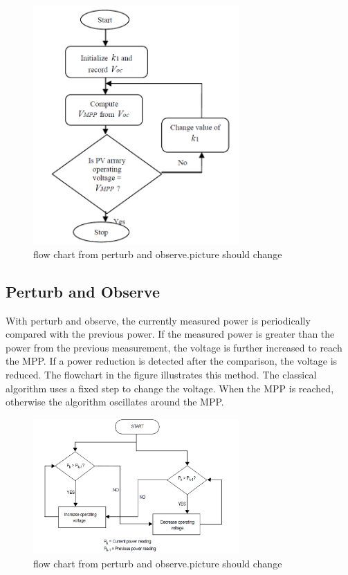 \begin{figure}[htbp]
	\begin{center}
		\includegraphics[width=0.7\textwidth]{../Pictures/P1/Flow_chart/Flow_chart_constant_voltage}
		\caption{flow chart from perturb and observe.picture should change }
		\label{fcconstantvoltage}
	\end{center}	
\end{figure}

\subsection{Perturb and Observe}
With perturb and observe, the currently measured power is periodically compared with the previous power. If the measured power is greater than the power from the previous measurement, the voltage is further increased to reach the MPP. If a power reduction is detected after the comparison, the voltage is reduced. The flowchart in the figure illustrates this method. The classical algorithm uses a fixed step to change the voltage. When the MPP is reached, otherwise the algorithm oscillates around the MPP.

\begin{figure}[htbp]
	\begin{center}
		\includegraphics[width=0.7\textwidth]{../Pictures/P1/Flow_chart/flow_chart_perturb_observe}
		\caption{flow chart from perturb and observe.picture should change }
		\label{fcperturbandobserve}
	\end{center}	
\end{figure}

